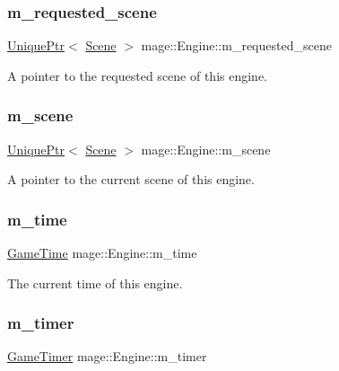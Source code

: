 \subsubsection{\texorpdfstring{m\+\_\+requested\+\_\+scene}{m\_requested\_scene}}
{\footnotesize\ttfamily \hyperlink{namespacemage_a3316d7143a973e37adf1110f2e80ca31}{Unique\+Ptr}$<$ \hyperlink{classmage_1_1_scene}{Scene} $>$ mage\+::\+Engine\+::m\+\_\+requested\+\_\+scene\hspace{0.3cm}{\ttfamily [private]}}

A pointer to the requested scene of this engine. \hypertarget{classmage_1_1_engine_a2d4037208a0529838c81ccea08c9de11}{}\label{classmage_1_1_engine_a2d4037208a0529838c81ccea08c9de11} 
\subsubsection{\texorpdfstring{m\+\_\+scene}{m\_scene}}
{\footnotesize\ttfamily \hyperlink{namespacemage_a3316d7143a973e37adf1110f2e80ca31}{Unique\+Ptr}$<$ \hyperlink{classmage_1_1_scene}{Scene} $>$ mage\+::\+Engine\+::m\+\_\+scene\hspace{0.3cm}{\ttfamily [private]}}

A pointer to the current scene of this engine. \hypertarget{classmage_1_1_engine_ab5f56d65109d276dd49ba43c504bbd26}{}\label{classmage_1_1_engine_ab5f56d65109d276dd49ba43c504bbd26} 
\subsubsection{\texorpdfstring{m\+\_\+time}{m\_time}}
{\footnotesize\ttfamily \hyperlink{classmage_1_1_game_time}{Game\+Time} mage\+::\+Engine\+::m\+\_\+time\hspace{0.3cm}{\ttfamily [private]}}

The current time of this engine. \hypertarget{classmage_1_1_engine_a360589e71a3d081c6a748aa283d1526d}{}\label{classmage_1_1_engine_a360589e71a3d081c6a748aa283d1526d} 
\subsubsection{\texorpdfstring{m\+\_\+timer}{m\_timer}}
{\footnotesize\ttfamily \hyperlink{classmage_1_1_game_timer}{Game\+Timer} mage\+::\+Engine\+::m\+\_\+timer\hspace{0.3cm}{\ttfamily [private]}}

